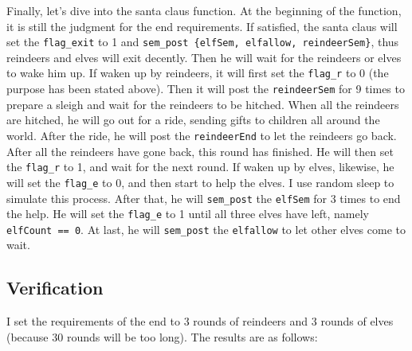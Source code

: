 Finally, let's dive into the santa claus function. At the beginning of the function, it is still the judgment for the end requirements. If satisfied, the santa claus will set the \texttt{flag\_exit} to 1 and \texttt{sem\_post \{elfSem, elfallow, reindeerSem\}}, thus reindeers and elves will exit decently. 
Then he will wait for the reindeers or elves to wake him up. If waken up by reindeers, it will first set the \texttt{flag\_r} to 0 (the purpose has been stated above). Then it will post the \texttt{reindeerSem} for 9 times to prepare a sleigh and wait for the reindeers to be hitched. When all the reindeers are hitched, he will go out for a ride, sending gifts to children all around the world.
After the ride, he will post the \texttt{reindeerEnd} to let the reindeers go back. After all the reindeers have gone back, this round has finished. He will then set the \texttt{flag\_r} to 1, and wait for the next round. If waken up by elves, 
likewise, he will set the \texttt{flag\_e} to 0, and then start to help the elves. I use random sleep to simulate this process. After that, he will \texttt{sem\_post} the \texttt{elfSem} for 3 times to end the help. He will set the \texttt{flag\_e} to 1 until all three elves have left, namely \texttt{elfCount == 0}. 
At last, he will \texttt{sem\_post} the \texttt{elfallow} to let other elves come to wait.

\subsection{Verification}
I set the requirements of the end to 3 rounds of reindeers and 3 rounds of elves (because 30 rounds will be too long). The results are as follows:

